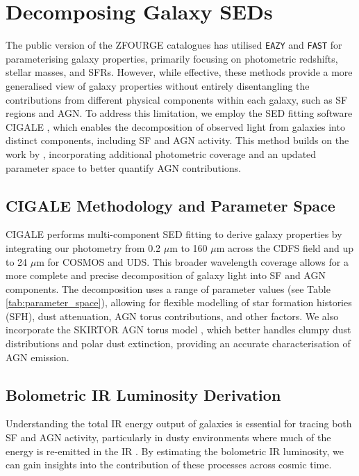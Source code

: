 \section{Decomposing Galaxy SEDs} \label{Sec: CIGALE}
The public version of the ZFOURGE catalogues has utilised \texttt{EAZY} \citep{brammer_eazy_2008} and \texttt{FAST} \citep{kriek_ultra-deep_2009} for parameterising galaxy properties, primarily focusing on photometric redshifts, stellar masses, and SFRs. However, while effective, these methods provide a more generalised view of galaxy properties without entirely disentangling the contributions from different physical components within each galaxy, such as SF regions and AGN. To address this limitation, we employ the SED fitting software CIGALE \citep{boquien_cigale_2019}, which enables the decomposition of observed light from galaxies into distinct components, including SF and AGN activity. This method builds on the work by \cite{cowley_decoupled_2018}, incorporating additional photometric coverage and an updated parameter space to better quantify AGN contributions.

\subsection{CIGALE Methodology and Parameter Space} \label{Sec: CIGALE_Parameters}
CIGALE performs multi-component SED fitting to derive galaxy properties by integrating our photometry from 0.2 $\mu$m to 160 $\mu$m across the CDFS field and up to 24 $\mu$m for COSMOS and UDS. This broader wavelength coverage allows for a more complete and precise decomposition of galaxy light into SF and AGN components. The decomposition uses a range of parameter values (see Table \ref{tab:parameter_space}), allowing for flexible modelling of star formation histories (SFH), dust attenuation, AGN torus contributions, and other factors. We also incorporate the SKIRTOR AGN torus model \citep{stalevski_dust_2016}, which better handles clumpy dust distributions and polar dust extinction, providing an accurate characterisation of AGN emission.

\subsection{Bolometric IR Luminosity Derivation} \label{Sec: IR_Luminosity}
Understanding the total IR energy output of galaxies is essential for tracing both SF and AGN activity, particularly in dusty environments where much of the energy is re-emitted in the IR \citep{fu_decomposing_2010}. By estimating the bolometric IR luminosity, we can gain insights into the contribution of these processes across cosmic time. 


